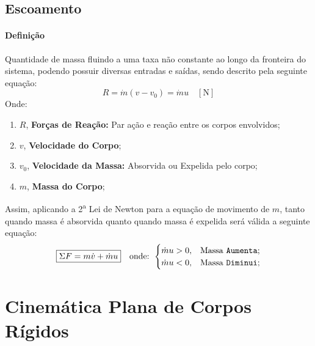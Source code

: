 \documentclass{article}
\begin{document}
        \subsection{Escoamento}
            \paragraph{Definição}Quantidade de massa fluindo a uma taxa não constante ao longo da fronteira do sistema, podendo possuir diversas entradas e saídas, sendo descrito pela seguinte equação:
                \begin{equation}
                    \boxed{
                        R = \dot{m} (v - v_{0}) = \dot{m} u
                        \quad
                        [\text{N}]
                    }
                \end{equation}
            Onde:
                \begin{enumerate}[rightmargin = \leftmargin, noitemsep]
                    \item $R$, \textbf{Forças de Reação:} Par ação e reação entre os corpos envolvidos;
                    \item $v$, \textbf{Velocidade do Corpo};
                    \item $v_{0}$, \textbf{Velocidade da Massa:} Absorvida ou Expelida pelo corpo;
                    \item $m$, \textbf{Massa do Corpo};
                \end{enumerate}
            Assim, aplicando a 2\textsuperscript{a} Lei de Newton para a equação de movimento de $m$, tanto quando massa é absorvida quanto quando massa é expelida será válida a seguinte equação:
                \begin{equation}
                    \boxed{
                        \Sigma F = m \dot{v} + \dot{m} u
                    }
                    \quad
                    \text{onde: }
                    \begin{cases}
                        \dot{m} u > 0, & \text{Massa \texttt{Aumenta}};\\
                        \dot{m} u < 0, & \text{Massa \texttt{Diminui}};\\
                    \end{cases}
                \end{equation}
\newpage

    \section{Cinemática Plana de Corpos Rígidos}
\end{document}

